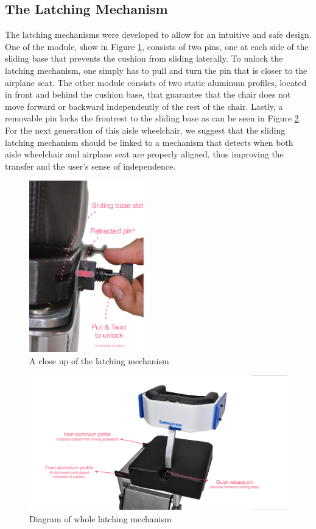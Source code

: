 \subsection{The Latching Mechanism}

The latching mechanisms were developed to allow for an intuitive and safe design. One of the module, show in Figure \ref{fig:latching},  consists of two pins, one at each side of the sliding base that prevents the cushion from sliding laterally. To unlock the latching mechanism, one simply has to pull and turn the pin that is closer to the airplane seat. The other module consists of two static aluminum profiles, located in front and behind the cushion base, that guarantee that the chair does not move forward or backward independently of the rest of the chair. Lastly, a removable pin locks the frontrest to the sliding base as can be seen in Figure \ref{fig:base}.
	For the next generation of this aisle wheelchair, we suggest that the sliding latching mechanism should be linked to a mechanism that detects when both aisle wheelchair and airplane seat are properly aligned, thus improving the transfer and the user's sense of independence.

\begin{figure}[h]
\centering
\includegraphics[width=5cm]{images/AisleWheelchair4.png}
\caption{A close up of the latching mechanism}
\label{fig:latching}
\end{figure}


\begin{figure}[h]
\centering
\includegraphics[width=13cm]{images/AisleWheelchair5.png}
\caption{Diagram of whole latching mechanism}
\label{fig:base}
\end{figure}

